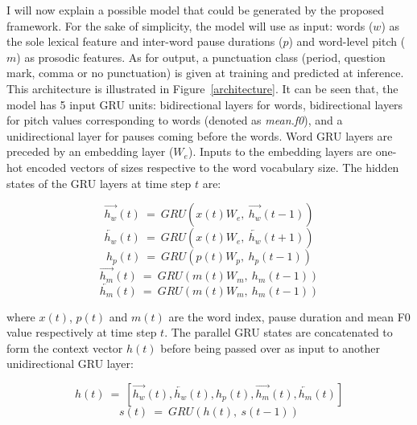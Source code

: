I will now explain a possible model that could be generated by the proposed framework. For the sake of simplicity, the model will use as input: words ($w$) as the sole lexical feature and inter-word pause durations ($p$) and word-level pitch ($m$) as prosodic features. As for output, a punctuation class (period, question mark, comma or no punctuation) is given at training and predicted at inference. This architecture is illustrated in Figure~\ref{architecture}. It can be seen that, the model has 5 input GRU units: bidirectional layers for words, bidirectional layers for pitch values corresponding to words (denoted as \textit{mean.f0}), and a unidirectional layer for pauses coming before the words. Word GRU layers are preceded by an embedding layer ($W_{e}$). Inputs to the embedding layers are one-hot encoded vectors of sizes respective to the word vocabulary size. The hidden states of the GRU layers at time step $t$ are:

\begin{equation}
\overrightarrow{h_{w}}(t)~=~GRU(x(t)W_{e},~\overrightarrow{h_{w}}(t-1)) 
\end{equation}
\begin{equation}
\overleftarrow{h_{w}}(t)~=~GRU(x(t)W_{e},~\overleftarrow{h_{w}}(t+1)) \end{equation}
\begin{equation}
h_{p}(t)~=~GRU(p(t)W_{p},~h_{p}(t-1))
\end{equation}
\begin{equation}
\overrightarrow{h_{m}}(t)~=~GRU(m(t)W_{m},~h_{m}(t-1))
\end{equation}
\begin{equation}
\overleftarrow{h_{m}}(t)~=~GRU(m(t)W_{m},~h_{m}(t-1))
\end{equation}

\noindent where $x(t)$, $p(t)$ and $m(t)$ are the word index, pause duration and mean F0 value respectively at time step $t$. %
The parallel GRU states are concatenated to form the context vector $h(t)$ before being passed over as input to another unidirectional GRU layer:

\begin{equation}
h(t)~=~\left[ \overrightarrow{h_{w}}(t), \overleftarrow{h_{w}}(t), h_{p}(t), \overrightarrow{h_{m}}(t), \overleftarrow{h_{m}}(t) \right] 
\end{equation}
\begin{equation}
s(t)~=~GRU(h(t),~s(t-1)) 
\end{equation}

